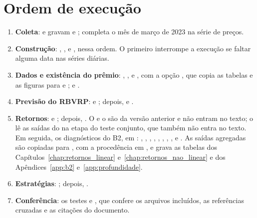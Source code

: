 \section{Ordem de execução}

\begin{enumerate}
    \item \textbf{Coleta}:  e
           gravam
           e ;
            completa o mês de março
          de 2023 na série de preços.
    \item \textbf{Construção}: ,
          ,  e
          , nessa ordem. O primeiro interrompe a
          execução se faltar alguma data nas séries diárias.
    \item \textbf{Dados e existência do prêmio}:
          , ,
           e ,
          com a opção , que copia as tabelas e as
          figuras para  e ;
           e
          .
    \item \textbf{Previsão do RBVRP}:  e
          ; depois,  e
          .
    \item \textbf{Retornos}:  e
          ; depois, . O
           e o  são da versão
          anterior e não entram no texto; o  lê as
          saídas do  na etapa do teste conjunto,
          que também não entra no texto. Em seguida, os diagnósticos
          do B2, em : ,
          , ,
          , ,
          , ,
          ,
           e
          . As saídas agregadas são
          copiadas para , com a procedência em
          , e  grava as tabelas
          dos Capítulos~\ref{chap:retornos_linear}
          e~\ref{chap:retornos_nao_linear} e dos Apêndices~\ref{app:b2}
          e~\ref{app:profundidade}.
    \item \textbf{Estratégias}: ; depois,
          .
    \item \textbf{Conferência}: os testes  e
          , que confere os arquivos
          incluídos, as referências cruzadas e as citações do documento.
\end{enumerate}

